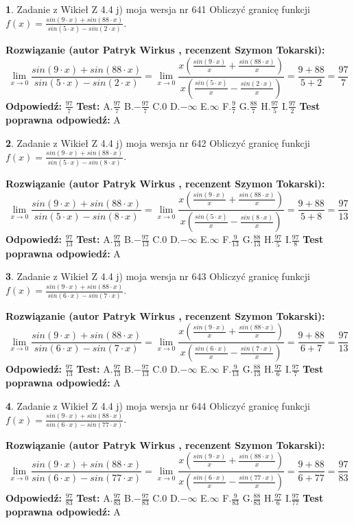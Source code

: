 \documentclass[12pt, a4paper]{article}
\theoremstyle{definition} %
\newtheorem{zad}{}
\newcommand{\zadStart}[1]{\begin{zad}#1\newline}
\newcommand{\zadStop}{\end{zad}}
\newcommand{\rozwStart}[2]{\noindent \textbf{Rozwiązanie (autor #1 , recenzent #2): }\newline}
\newcommand{\rozwStop}{\newline}
\newcommand{\odpStart}{\noindent \textbf{Odpowiedź:}\newline}
\newcommand{\odpStop}{\newline}
\newcommand{\testStart}{\noindent \textbf{Test:}\newline}
\newcommand{\testStop}{\newline}
\newcommand{\kluczStart}{\noindent \textbf{Test poprawna odpowiedź:}\newline}
\newcommand{\kluczStop}{\newline}
\begin{document}
\zadStart{Zadanie z Wikieł Z 4.4 j) moja wersja nr 641}
Obliczyć granicę funkcji $f(x)=\frac{sin(9\cdot x) +sin(88\cdot x)}{sin(5\cdot x) -sin(2\cdot x)}$.
\zadStop
\rozwStart{Patryk Wirkus}{Szymon Tokarski}
$$\lim\limits_{x\to 0}\frac{sin(9\cdot x) +sin(88\cdot x)}{sin(5\cdot x) -sin(2\cdot x)}=\lim\limits_{x\to 0}\frac{x(\frac{sin(9\cdot x)}{x}+\frac{sin(88\cdot x)}{x})}{x(\frac{sin(5\cdot x)}{x}-\frac{sin(2\cdot x)}{x})}=\frac{9+88}{5+2} = \frac{97}{7}$$
\rozwStop
\odpStart
$\frac{97}{7}$
\odpStop
\testStart
A.$\frac{97}{7}$
B.$-\frac{97}{7}$
C.$0$
D.$-\infty$
E.$\infty$
F.$\frac{9}{7}$
G.$\frac{88}{7}$
H.$\frac{97}{5}$
I.$\frac{97}{2}$
\testStop
\kluczStart
A
\kluczStop



\zadStart{Zadanie z Wikieł Z 4.4 j) moja wersja nr 642}
Obliczyć granicę funkcji $f(x)=\frac{sin(9\cdot x) +sin(88\cdot x)}{sin(5\cdot x) -sin(8\cdot x)}$.
\zadStop
\rozwStart{Patryk Wirkus}{Szymon Tokarski}
$$\lim\limits_{x\to 0}\frac{sin(9\cdot x) +sin(88\cdot x)}{sin(5\cdot x) -sin(8\cdot x)}=\lim\limits_{x\to 0}\frac{x(\frac{sin(9\cdot x)}{x}+\frac{sin(88\cdot x)}{x})}{x(\frac{sin(5\cdot x)}{x}-\frac{sin(8\cdot x)}{x})}=\frac{9+88}{5+8} = \frac{97}{13}$$
\rozwStop
\odpStart
$\frac{97}{13}$
\odpStop
\testStart
A.$\frac{97}{13}$
B.$-\frac{97}{13}$
C.$0$
D.$-\infty$
E.$\infty$
F.$\frac{9}{13}$
G.$\frac{88}{13}$
H.$\frac{97}{5}$
I.$\frac{97}{8}$
\testStop
\kluczStart
A
\kluczStop



\zadStart{Zadanie z Wikieł Z 4.4 j) moja wersja nr 643}
Obliczyć granicę funkcji $f(x)=\frac{sin(9\cdot x) +sin(88\cdot x)}{sin(6\cdot x) -sin(7\cdot x)}$.
\zadStop
\rozwStart{Patryk Wirkus}{Szymon Tokarski}
$$\lim\limits_{x\to 0}\frac{sin(9\cdot x) +sin(88\cdot x)}{sin(6\cdot x) -sin(7\cdot x)}=\lim\limits_{x\to 0}\frac{x(\frac{sin(9\cdot x)}{x}+\frac{sin(88\cdot x)}{x})}{x(\frac{sin(6\cdot x)}{x}-\frac{sin(7\cdot x)}{x})}=\frac{9+88}{6+7} = \frac{97}{13}$$
\rozwStop
\odpStart
$\frac{97}{13}$
\odpStop
\testStart
A.$\frac{97}{13}$
B.$-\frac{97}{13}$
C.$0$
D.$-\infty$
E.$\infty$
F.$\frac{9}{13}$
G.$\frac{88}{13}$
H.$\frac{97}{6}$
I.$\frac{97}{7}$
\testStop
\kluczStart
A
\kluczStop



\zadStart{Zadanie z Wikieł Z 4.4 j) moja wersja nr 644}
Obliczyć granicę funkcji $f(x)=\frac{sin(9\cdot x) +sin(88\cdot x)}{sin(6\cdot x) -sin(77\cdot x)}$.
\zadStop
\rozwStart{Patryk Wirkus}{Szymon Tokarski}
$$\lim\limits_{x\to 0}\frac{sin(9\cdot x) +sin(88\cdot x)}{sin(6\cdot x) -sin(77\cdot x)}=\lim\limits_{x\to 0}\frac{x(\frac{sin(9\cdot x)}{x}+\frac{sin(88\cdot x)}{x})}{x(\frac{sin(6\cdot x)}{x}-\frac{sin(77\cdot x)}{x})}=\frac{9+88}{6+77} = \frac{97}{83}$$
\rozwStop
\odpStart
$\frac{97}{83}$
\odpStop
\testStart
A.$\frac{97}{83}$
B.$-\frac{97}{83}$
C.$0$
D.$-\infty$
E.$\infty$
F.$\frac{9}{83}$
G.$\frac{88}{83}$
H.$\frac{97}{6}$
I.$\frac{97}{77}$
\testStop
\kluczStart
A
\kluczStop
\end{document}
